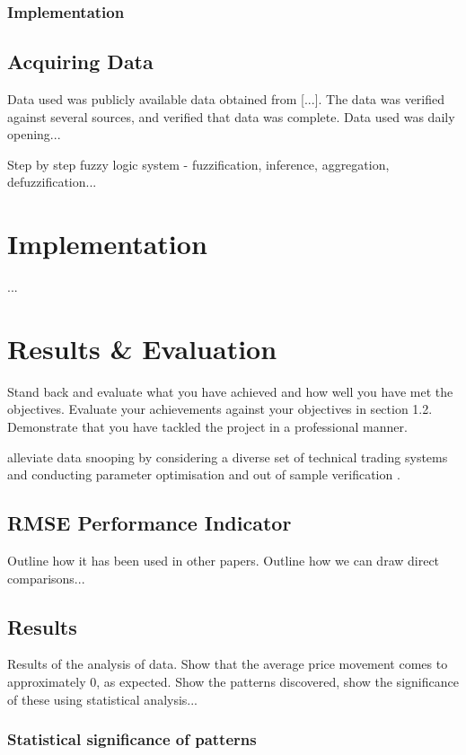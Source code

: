 \documentclass{article}
\theoremstyle{definition}
\begin{document}
\subsubsection{Implementation}

\subsection{Acquiring Data}

Data used was publicly available data obtained from [...]. The data was verified against several sources, and verified that data was complete. Data used was daily opening...

Step by step fuzzy logic system - fuzzification, inference, aggregation, defuzzification...

\section{Implementation}

...

\section{Results \& Evaluation}
Stand back and evaluate what you have achieved and how well you have met the objectives. Evaluate your achievements against your objectives in section 1.2. Demonstrate that you have tackled the project in a professional manner. 

alleviate data snooping by considering a diverse set of technical trading systems and conducting parameter optimisation and out of sample verification \citep{taprofitability}.

\subsection{RMSE Performance Indicator}

Outline how it has been used in other papers. Outline how we can draw direct comparisons...

\subsection{Results}

Results of the analysis of data. Show that the average price movement comes to approximately 0, as expected. Show the patterns discovered, show the significance of these using statistical analysis...

\subsubsection{Statistical significance of patterns}
\end{document}
